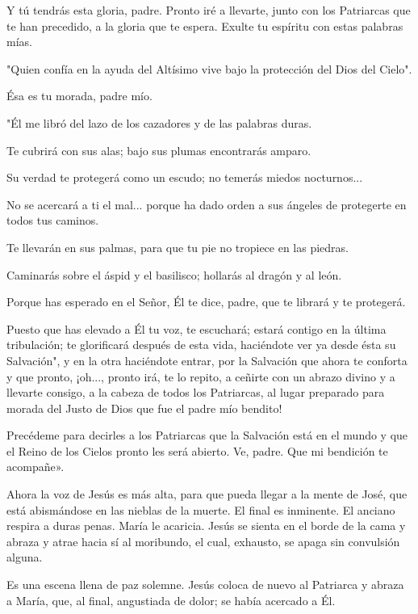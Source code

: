 \documentclass[12pt, twoside, openright]{book} %
\begin{document}
Y tú tendrás esta gloria, padre. Pronto iré a llevarte, junto con los Patriarcas que te han precedido, a la gloria que te espera. Exulte tu espíritu con estas palabras mías. 

"Quien confía en la ayuda del Altísimo vive bajo la protección del Dios del Cielo". 

Ésa es tu morada, padre mío. 

"Él me libró del lazo de los cazadores y de las palabras duras. 

Te cubrirá con sus alas; bajo sus plumas encontrarás amparo. 

Su verdad te protegerá como un escudo; no temerás miedos nocturnos... 

No se acercará a ti el mal... porque ha dado orden a sus ángeles de protegerte en todos tus caminos. 

Te llevarán en sus palmas, para que tu pie no tropiece en las piedras. 

Caminarás sobre el áspid y el basilisco; hollarás al dragón y al león. 

Porque has esperado en el Señor, Él te dice, padre, que te librará y te protegerá. 

Puesto que has elevado a Él tu voz, te escuchará; estará contigo en la última tribulación; te glorificará después de esta vida, haciéndote ver ya desde ésta su Salvación", y en la otra haciéndote entrar, por la Salvación que ahora te conforta y que pronto, ¡oh..., pronto irá, te lo repito, a ceñirte con un abrazo divino y a llevarte consigo, a la cabeza de todos los Patriarcas, al lugar preparado para morada del Justo de Dios que fue el padre mío bendito! 

Precédeme para decirles a los Patriarcas que la Salvación está en el mundo y que el Reino de los Cielos pronto les será abierto. Ve, padre. Que mi bendición te acompañe». 

Ahora la voz de Jesús es más alta, para que pueda llegar a la mente de José, que está abismándose en las nieblas de la muerte. El final es inminente. El anciano respira a duras penas. María le acaricia. Jesús se sienta en el borde de la cama y abraza y atrae hacia sí al moribundo, el cual, exhausto, se apaga sin convulsión alguna. 

Es una escena llena de paz solemne. Jesús coloca de nuevo al Patriarca y abraza a María, que, al final, angustiada de dolor; se había acercado a Él. 
\end{document}
